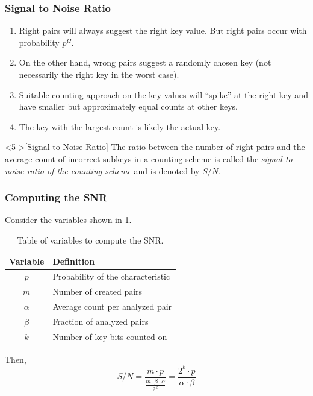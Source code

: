 \documentclass{beamer}
\begin{document}
	\begin{frame}
		\frametitle{Signal to Noise Ratio}
		\begin{enumerate}
			\item Right pairs will always suggest the right key value. But right
			pairs occur with probability \(p^\Omega\).
			\item<2-> On the other hand, wrong pairs suggest a randomly chosen
			key (not necessarily the right key in the worst case).
			\item<3-> Suitable counting approach on the key values will
			``spike'' at the right key and have smaller but approximately equal
			counts at other keys.
			\item<4-> The key with the largest count is likely the actual key.
		\end{enumerate}
		\begin{definition}<5->[Signal-to-Noise Ratio]
			The ratio between the number of right pairs and the average count of
			incorrect subkeys in a counting scheme is called the \emph{signal to
			noise ratio of the counting scheme} and is denoted by \(S/N\).
		\end{definition}
	\end{frame}

	\begin{frame}
		\frametitle{Computing the SNR}
		Consider the variables shown in \cref{tab:snr-vars}.
		\begin{table}[!ht]
			\centering
			\begin{tabular}{|c|l|}
				\hline
				\textbf{Variable} & \textbf{Definition} \\
				\hline
				\(p\) & Probability of the characteristic \\
				\hline
				\(m\) & Number of created pairs \\
				\hline
				\(\alpha\) & Average count per analyzed pair \\
				\hline
				\(\beta\) & Fraction of analyzed pairs \\
				\hline
				\(k\) & Number of key bits counted on \\
				\hline
			\end{tabular}
			\caption{Table of variables to compute the SNR.}
			\label{tab:snr-vars}
		\end{table}
		\pause
		Then,
		\begin{equation}
			S/N = \frac{m \cdot p}{\frac{m \cdot \beta \cdot \alpha}{2^k}} = \frac{2^k \cdot p}{\alpha \cdot \beta}
			\label{eq:snr-expr}
		\end{equation}
	\end{frame}
\end{document}

